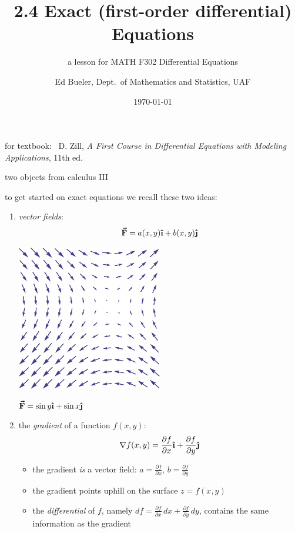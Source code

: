 \documentclass{beamer}
\title{2.4 Exact (first-order differential) Equations}
\subtitle{a lesson for MATH F302 Differential Equations}
\author{Ed Bueler, Dept.~of Mathematics and Statistics, UAF}
\date{\tiny \today}
\newcommand{\grad}{\nabla}
\newcommand{\ih}{\boldsymbol{\hat{\textbf{\i}}}}
\newcommand{\jh}{\boldsymbol{\hat{\textbf{\j}}}}
\begin{document}
\begin{frame}
\titlepage

\centerline{\tiny for textbook: \, D. Zill, \emph{A First Course in Differential Equations with Modeling Applications}, 11th ed.}
\end{frame}


\begin{frame}{two objects from calculus III}

to get started on exact equations we recall these two ideas:
\begin{enumerate}
\item \begin{minipage}[t]{0.4\textwidth}
\emph{vector fields}:
    $$\boldsymbol{\vec{\textbf{F}}} = a(x,y) \ih + b(x,y) \jh$$
\end{minipage}
\begin{minipage}[t]{0.5\textwidth}
\vspace{-2mm}

\hfill \includegraphics[width=0.5\textwidth]{figs/VectorField}

\hfill \tiny $\boldsymbol{\vec{\textbf{F}}} = \sin y \ih + \sin x \jh$
\end{minipage}

\vspace{-4mm}
\item the \emph{gradient} of a function $f(x,y)$:
    $$\grad f(x,y) = \frac{\partial f}{\partial x} \ih + \frac{\partial f}{\partial y} \jh$$
    \begin{itemize}
    \item the gradient \emph{is} a vector field:  $a=\frac{\partial f}{\partial x}$, $b=\frac{\partial f}{\partial y}$
    \item the gradient points uphill on the surface $z=f(x,y)$
    \item the \emph{differential} of $f$, namely $df = \frac{\partial f}{\partial x}\,dx + \frac{\partial f}{\partial y}\,dy$, contains the same information as the gradient
    \end{itemize}
\end{enumerate}
\end{frame}
\end{document}
